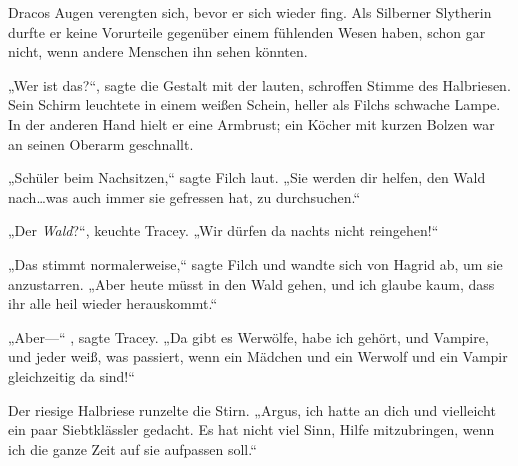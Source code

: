 Dracos Augen verengten sich, bevor er sich wieder fing. Als Silberner Slytherin durfte er keine Vorurteile gegenüber einem fühlenden Wesen haben, schon gar nicht, wenn andere Menschen ihn sehen könnten.

„Wer ist das?“, sagte die Gestalt mit der lauten, schroffen Stimme des Halbriesen. Sein Schirm leuchtete in einem weißen Schein, heller als Filchs schwache Lampe. In der anderen Hand hielt er eine Armbrust; ein Köcher mit kurzen Bolzen war an seinen Oberarm geschnallt.

„Schüler beim Nachsitzen,“ sagte Filch laut. „Sie werden dir helfen, den Wald nach…was auch immer sie gefressen hat, zu durchsuchen.“

„Der \emph{Wald}?“, keuchte Tracey. „Wir dürfen da nachts nicht reingehen!“

„Das stimmt normalerweise,“ sagte Filch und wandte sich von Hagrid ab, um sie anzustarren. „Aber heute müsst in den Wald gehen, und ich glaube kaum, dass ihr alle heil wieder herauskommt.“

„Aber—“ , sagte Tracey. „Da gibt es Werwölfe, habe ich gehört, und Vampire, und jeder weiß, was passiert, wenn ein Mädchen und ein Werwolf und ein Vampir gleichzeitig da sind!“

Der riesige Halbriese runzelte die Stirn. „Argus, ich hatte an dich und vielleicht ein paar Siebtklässler gedacht. Es hat nicht viel Sinn, Hilfe mitzubringen, wenn ich die ganze Zeit auf sie aufpassen soll.“

